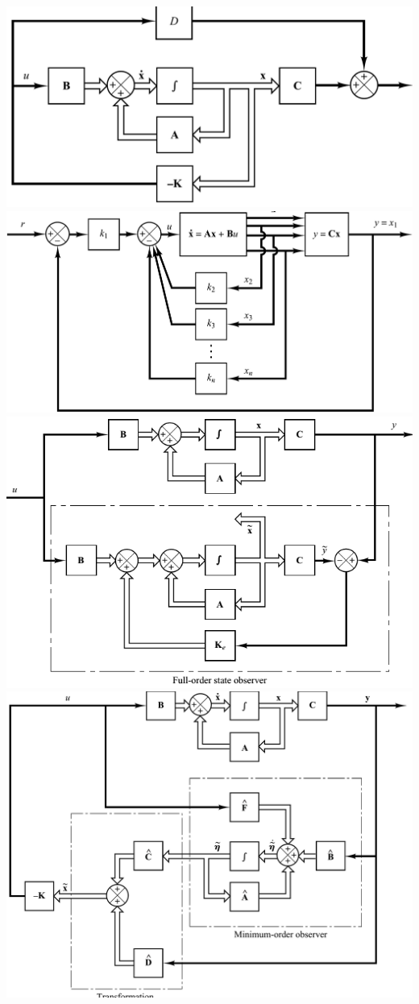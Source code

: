 \begin{multicols*}{3}
\includegraphics[width=\linewidth]{keFeedback.png}
\includegraphics[width=\linewidth]{whyNot.png}
\includegraphics[width=\linewidth]{full-state-obs.png}
\includegraphics[width=\linewidth]{min-order-observer.png}
\end{multicols*}